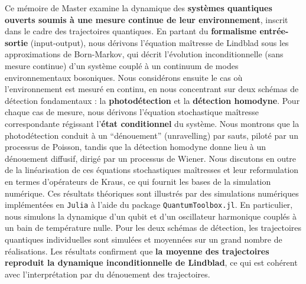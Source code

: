 \begin{tcolorbox}[colback=white, colframe=black, boxrule=0.6pt, arc=0pt, left=8pt, right=8pt, top=6pt, bottom=6pt]
    \hspace{6mm} Ce mémoire de Master examine la dynamique des \textbf{systèmes quantiques ouverts soumis à une mesure continue de leur environnement}, inscrit dans le cadre des trajectoires quantiques. En partant du \textbf{formalisme entrée-sortie} (input-output), nous dérivons l'équation maîtresse de Lindblad sous les approximations de Born-Markov, qui décrit l'évolution inconditionnelle (sans mesure continue) d'un système couplé à un continuum de modes environnementaux bosoniques. Nous considérons ensuite le cas où l'environnement est mesuré en continu, en nous concentrant sur deux schémas de détection fondamentaux : la \textbf{photodétection} et la \textbf{détection homodyne}. Pour chaque cas de mesure, nous dérivons l'équation stochastique maîtresse correspondante régissant l'\textbf{état conditionnel} du système. Nous montrons que la photodétection conduit à un ``dénouement'' (unravelling) par sauts, piloté par un processus de Poisson, tandis que la détection homodyne donne lieu à un dénouement diffusif, dirigé par un processus de Wiener. Nous discutons en outre de la linéarisation de ces équations stochastiques maîtresses et leur reformulation en termes d'opérateurs de Kraus, ce qui fournit les bases de la simulation numérique. Ces résultats théoriques sont illustrés par des simulations numériques implémentées en \verb|Julia| à l'aide du package \verb|QuantumToolbox.jl|. En particulier, nous simulons la dynamique d'un qubit et d'un oscillateur harmonique couplés à un bain de température nulle. Pour les deux schémas de détection, les trajectoires quantiques individuelles sont simulées et moyennées sur un grand nombre de réalisations. Les résultats confirment que \textbf{la moyenne des trajectoires reproduit la dynamique inconditionnelle de Lindblad}, ce qui est cohérent avec l'interprétation par du dénouement des trajectoires.
\end{tcolorbox}